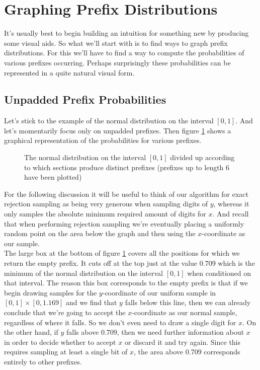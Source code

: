 \section{Graphing Prefix Distributions}

It's usually best to begin building an intuition for something new by producing some visual aids. So what we'll start with is to find ways to graph prefix distributions. For this we'll have to find a way to compute the probabilities of various prefixes occurring. Perhaps surprisingly these probabilities can be represented in a quite natural visual form.

\subsection{Unpadded Prefix Probabilities}

Let's stick to the example of the normal distribution on the interval $[0,1]$. And let's momentarily focus only on unpadded prefixes. Then figure \ref{fig:normal_bin_cover} shows a graphical representation of the probabilities for various prefixes.

\begin{figure}
    \centering
    
    \caption{The normal distribution on the interval $[0,1]$ divided up according to which sections produce distinct prefixes (prefixes up to length 6 have been plotted)}
    \label{fig:normal_bin_cover}
\end{figure}

For the following discussion it will be useful to think of our algorithm for exact rejection sampling as being very generous when sampling digits of $y$, whereas it only samples the absolute minimum required amount of digits for $x$. And recall that when performing rejection sampling we're eventually placing a uniformly random point on the area below the graph and then using the $x$-coordinate as our sample.\\
The large box at the bottom of figure \ref{fig:normal_bin_cover} covers all the positions for which we return the empty prefix. It cuts off at the top just at the value 0.709 which is the minimum of the normal distribution on the interval $[0,1]$ when conditioned on that interval. The reason this box corresponds to the empty prefix is that if we begin drawing samples for the $y$-coordinate of our uniform sample in $[0,1]\times[0,1.169]$ and we find that $y$ falls below this line, then we can already conclude that we're going to accept the $x$-coordinate as our normal sample, regardless of where it falls. So we don't even need to draw a single digit for $x$. On the other hand, if $y$ falls above 0.709, then we need further information about $x$ in order to decide whether to accept $x$ or discard it and try again. Since this requires sampling at least a single bit of $x$, the area above 0.709 corresponds entirely to other prefixes.

